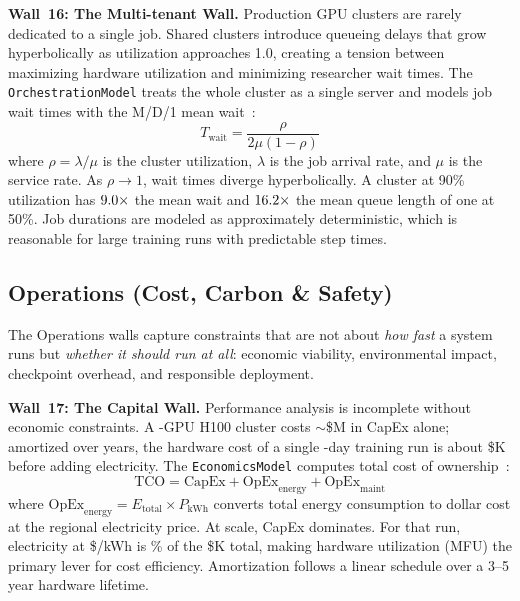 \documentclass[10pt,twocolumn]{article}
\begin{document}
\textbf{Wall~16: The Multi-tenant Wall.} Production GPU clusters are rarely dedicated to a single job. Shared clusters introduce queueing delays that grow hyperbolically as utilization approaches 1.0, creating a tension between maximizing hardware utilization and minimizing researcher wait times. The \texttt{OrchestrationModel} treats the whole cluster as a single server and models job wait times with the M/D/1 mean wait~\citep{harcholbalter2013}:
\begin{equation}
\label{eq:queue}
T_{\text{wait}} = \frac{\rho}{2\mu(1 - \rho)}
\end{equation}
where $\rho = \lambda / \mu$ is the cluster utilization, $\lambda$ is the job arrival rate, and $\mu$ is the service rate. As $\rho \to 1$, wait times diverge hyperbolically. A cluster at 90\% utilization has $9.0{\times}$ the mean wait and $16.2{\times}$ the mean queue length of one at 50\%. Job durations are modeled as approximately deterministic, which is reasonable for large training runs with predictable step times.

\subsection{Operations (Cost, Carbon \& Safety)}
\label{sec:walls-operations}

The Operations walls capture constraints that are not about \emph{how fast} a system runs but \emph{whether it should run at all}: economic viability, environmental impact, checkpoint overhead, and responsible deployment.

\textbf{Wall~17: The Capital Wall.} Performance analysis is incomplete without economic constraints. A \WallSeventeenGpus-GPU H100 cluster costs ${\sim}$\$\WallSeventeenClusterCapexM{}M in CapEx alone; amortized over \WallSeventeenAmortYears{} years, the hardware cost of a single \WallSeventeenDays-day training run is about \$\WallSeventeenRunCapexK{}K before adding electricity. The \texttt{EconomicsModel} computes total cost of ownership~\citep{barroso2019}:
\begin{equation}
\label{eq:tco}
\text{TCO} = \text{CapEx} + \text{OpEx}_{\text{energy}} + \text{OpEx}_{\text{maint}}
\end{equation}
where $\text{OpEx}_{\text{energy}} = E_{\text{total}} \times P_{\text{kWh}}$ converts total energy consumption to dollar cost at the regional electricity price. At scale, CapEx dominates. For that run, electricity at \$\WallSeventeenKwhPrice/kWh is \WallSeventeenElectricitySharePct\% of the \$\WallSeventeenTcoK{}K total, making hardware utilization (MFU) the primary lever for cost efficiency. Amortization follows a linear schedule over a 3--5 year hardware lifetime.
\end{document}
